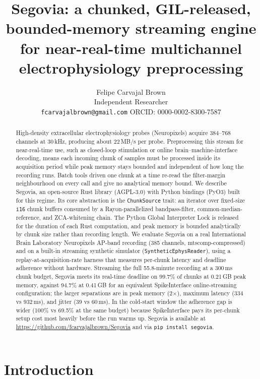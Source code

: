 \documentclass[11pt]{article}
\title{Segovia: a chunked, GIL-released, bounded-memory streaming engine
for near-real-time multichannel electrophysiology preprocessing}
\author{Felipe Carvajal Brown\\
\small Independent Researcher\\
\small \texttt{fcarvajalbrown@gmail.com} \quad ORCID: 0000-0002-8300-7587}
\date{}
\begin{document}
\maketitle

\begin{abstract}
High-density extracellular electrophysiology probes (Neuropixels) acquire 384--768 channels at
30\,kHz, producing about 22\,MB/s per probe. Preprocessing this stream for near-real-time use, such
as closed-loop stimulation or online brain--machine-interface decoding, means each incoming chunk of
samples must be processed inside its acquisition period while peak memory stays bounded and
independent of how long the recording runs. Batch tools driven one chunk at a time re-read the
filter-margin neighbourhood on every call and give no analytical memory bound. We describe Segovia,
an open-source Rust library (AGPL-3.0) with Python bindings (PyO3) built for this regime. Its core
abstraction is the \texttt{ChunkSource} trait: an iterator over fixed-size \texttt{i16} chunk buffers
consumed by a Rayon-parallelized bandpass-filter, common-median-reference, and ZCA-whitening chain.
The Python Global Interpreter Lock is released for the duration of each Rust computation, and peak
memory is bounded analytically by chunk size rather than recording length. We evaluate Segovia on a
real International Brain Laboratory Neuropixels AP-band recording (385 channels, mtscomp-compressed)
and on a built-in streaming synthetic simulator (\texttt{SyntheticEphysReader}), using a
replay-at-acquisition-rate harness that measures per-chunk latency and deadline adherence without
hardware. Streaming the full 55.8-minute recording at a 300\,ms chunk budget, Segovia meets its
real-time deadline on 99.7\% of chunks at 0.21\,GB peak memory, against 94.7\% at 0.41\,GB for an
equivalent SpikeInterface online-streaming configuration; the larger separations are in peak memory
(2$\times$), maximum latency (334 vs 932\,ms), and jitter (39 vs 60\,ms). In the cold-start window the
adherence gap is wider (100\% vs 69.5\% at the same budget) because SpikeInterface pays its per-chunk
setup cost most heavily before the run warms up. Segovia is available at
\url{https://github.com/fcarvajalbrown/Segovia} and via \texttt{pip install segovia}.
\end{abstract}

\section{Introduction}
\end{document}
